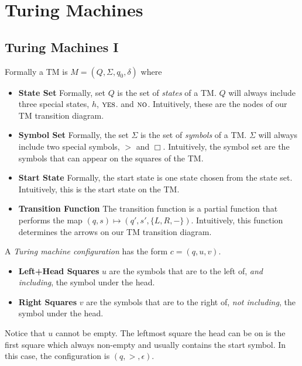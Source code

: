 
\chapter{Turing Machines}



\section{Turing Machines I}

Formally a TM is $M = (Q,\Sigma,q_0,\delta)$ 
where 

\begin{itemize}   
\renewcommand{\labelitemi}{$\Box$}
\item \textbf{State Set} Formally, set $Q$ is the set of \textit{states} of a TM. 
$Q$ will always include three special states, $h$, $\textsc{yes}$.
and $\textsc{no}$. Intuitively, these are the nodes of our TM transition diagram.
%
\item \textbf{Symbol Set} Formally, the set $\Sigma$ is 
the set of \textit{symbols} of a TM. 
$\Sigma$ will always include two special symbols, $>$ and $\Box$.
Intuitively, the symbol set are the symbols that can appear on the squares of the TM.
%
\item \textbf{Start State} Formally, the start state is one state chosen 
from the state set. 
Intuitively, this is the start state on the TM. 
%
\item \textbf{Transition Function} The transition function is a partial function 
that performs the map $(q,s) \mapsto (q',s',\{L,R,-\})$.
Intuitively, this function determines the arrows on our TM transition diagram.
\end{itemize} 

\frmrule


A \textit{Turing machine configuration} has the form $c = (q,u,v)$. 

\begin{itemize}   
\renewcommand{\labelitemi}{$\Box$}
\item \textbf{Left+Head Squares} $u$ are the symbols that are to the left of, 
\textit{and including}, the symbol under the head.
%
\item \textbf{Right Squares} $v$ are the symbols that are to the right of, 
\textit{not including}, the symbol under the head.
\end{itemize}

Notice that $u$ cannot be empty. The leftmost square the head can be on is 
the first square which always non-empty and usually 
contains the start symbol. In this case, 
the configuration is $(q,>,\epsilon)$.

